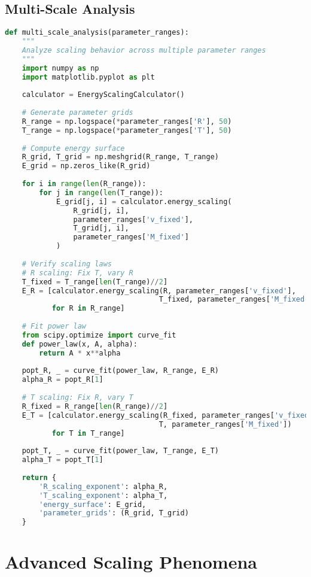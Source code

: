 \documentclass[12pt,a4paper]{article}
\begin{document}
\subsection{Multi-Scale Analysis}

\begin{lstlisting}[language=Python]
def multi_scale_analysis(parameter_ranges):
    """
    Analyze scaling behavior across multiple parameter ranges
    """
    import numpy as np
    import matplotlib.pyplot as plt
    
    calculator = EnergyScalingCalculator()
    
    # Generate parameter grids
    R_range = np.logspace(*parameter_ranges['R'], 50)
    T_range = np.logspace(*parameter_ranges['T'], 50)
    
    # Compute energy surface
    R_grid, T_grid = np.meshgrid(R_range, T_range)
    E_grid = np.zeros_like(R_grid)
    
    for i in range(len(R_range)):
        for j in range(len(T_range)):
            E_grid[j, i] = calculator.energy_scaling(
                R_grid[j, i], 
                parameter_ranges['v_fixed'], 
                T_grid[j, i],
                parameter_ranges['M_fixed']
            )
    
    # Verify scaling laws
    # R scaling: Fix T, vary R
    T_fixed = T_range[len(T_range)//2]
    E_R = [calculator.energy_scaling(R, parameter_ranges['v_fixed'], 
                                    T_fixed, parameter_ranges['M_fixed']) 
           for R in R_range]
    
    # Fit power law
    from scipy.optimize import curve_fit
    def power_law(x, A, alpha):
        return A * x**alpha
    
    popt_R, _ = curve_fit(power_law, R_range, E_R)
    alpha_R = popt_R[1]
    
    # T scaling: Fix R, vary T
    R_fixed = R_range[len(R_range)//2]
    E_T = [calculator.energy_scaling(R_fixed, parameter_ranges['v_fixed'], 
                                    T, parameter_ranges['M_fixed']) 
           for T in T_range]
    
    popt_T, _ = curve_fit(power_law, T_range, E_T)
    alpha_T = popt_T[1]
    
    return {
        'R_scaling_exponent': alpha_R,
        'T_scaling_exponent': alpha_T,
        'energy_surface': E_grid,
        'parameter_grids': (R_grid, T_grid)
    }
\end{lstlisting}

\section{Advanced Scaling Phenomena}
\end{document}
